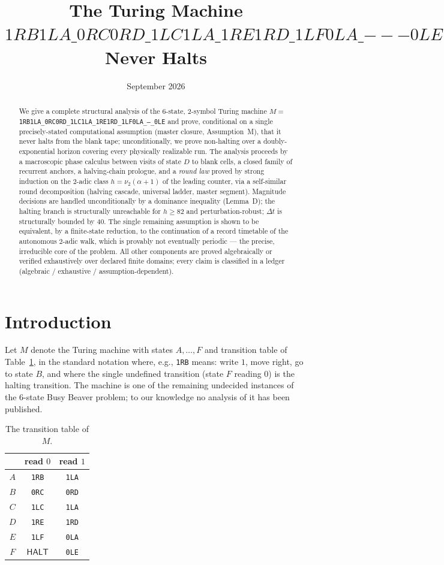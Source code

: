 \documentclass[11pt]{amsart}
\title{The Turing Machine $1RB1LA\_0RC0RD\_1LC1LA\_1RE1RD\_1LF0LA\_{---}0LE$ Never Halts}
\author{}
\date{September 2026}
\theoremstyle{definition}
\DeclareMathOperator{\HALT}{\textsf{HALT}}
\begin{document}
\maketitle

\begin{abstract}
We give a complete structural analysis of the $6$-state, $2$-symbol
Turing machine $M=$ \texttt{1RB1LA\_0RC0RD\_1LC1LA\_1RE1RD\_1LF0LA\_---\_0LE}
and prove, conditional on a single precisely-stated computational
assumption (master closure, Assumption~M), that it never halts from the
blank tape; unconditionally, we prove non-halting over a doubly-exponential
horizon covering every physically realizable run. The analysis proceeds by
a macroscopic phase calculus between visits of state $D$ to blank cells,
a closed family of recurrent anchors, a halving-chain prologue, and a
\emph{round law} proved by strong induction on the $2$-adic class
$h=\nu_2(\alpha+1)$ of the leading counter, via a self-similar round
decomposition (halving cascade, universal ladder, master segment).
Magnitude decisions are handled unconditionally by a dominance inequality
(Lemma~D); the halting branch is structurally unreachable for $h\ge82$
and perturbation-robust; $\Delta t$ is structurally bounded by $40$. The
single remaining assumption is shown to be equivalent, by a
finite-state reduction, to the continuation of a record timetable of the
autonomous $2$-adic walk, which is provably not eventually periodic --- the
precise, irreducible core of the problem. All other components are proved
algebraically or verified exhaustively over declared finite domains;
every claim is classified in a ledger (algebraic / exhaustive /
assumption-dependent).
\end{abstract}

\section{Introduction}\label{s:intro}

Let $M$ denote the Turing machine with states $A,\dots,F$ and transition
table of Table~\ref{tab:tm}, in the standard notation where, e.g.,
\texttt{1RB} means: write $1$, move right, go to state $B$, and where the
single undefined transition (state $F$ reading $0$) is the halting
transition. The machine is one of the remaining undecided instances of the
$6$-state Busy Beaver problem; to our knowledge no analysis of it has been
published.

\begin{table}[h]
\centering
\begin{tabular}{c|cc}
 & read $0$ & read $1$\\\toprule
$A$ & \texttt{1RB} & \texttt{1LA}\\
$B$ & \texttt{0RC} & \texttt{0RD}\\
$C$ & \texttt{1LC} & \texttt{1LA}\\
$D$ & \texttt{1RE} & \texttt{1RD}\\
$E$ & \texttt{1LF} & \texttt{0LA}\\
$F$ & $\HALT$ & \texttt{0LE}\\
\end{tabular}
\caption{The transition table of $M$.}
\label{tab:tm}
\end{table}
\end{document}
